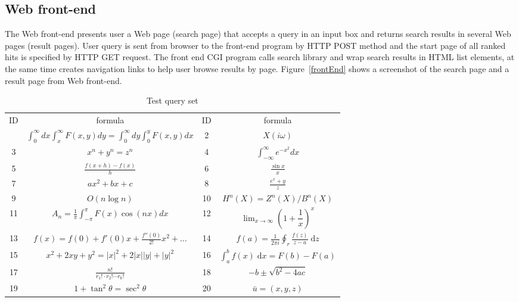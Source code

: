 \subsection{Web front-end}
The Web front-end presents user a Web page (search page) that accepts a query in an input box and returns search results in several Web pages (result pages). 
User query is sent from browser to the front-end program by HTTP POST method and the start page of all ranked hits is specified by HTTP GET request.
The front end CGI program calls search library and wrap search results in HTML list elements, at the same time creates navigation links to help user browse results by page.
Figure~\ref{frontEnd} shows a screenshot of the search page and a result page from Web front-end.

\begin{table*}
\begin{center}
\renewcommand{\arraystretch}{1.5}
\begin{tabular}{|c|c||c|c|}\hline
ID & formula & ID & formula \\ \thickhline
1 & 
$\int_0^\infty dx \int_{x}^\infty F(x,y)dy  =\int_0^\infty dy \int_{0}^y F(x,y)dx$ &
2 & 
$X(i\omega)$ \\\hline

3 & 
$x^n + y^n=z^n$ &
4 & 
$\int^{\infty}_{-\infty} e^{-x^2} dx$ \\\hline

5 & 
$\frac{f(x+h)-f(x)}{h}$ &
6 & 
$\frac {\sin x} x$ \\\hline

7 & 
$ax^2 + bx +c$ &
8 & 
$\frac {e^x + y}{z}$ \\\hline

9 & 
$O(n \log n)$ &
10 & 
$H^n(X) = Z^n (X) / B^n(X)$ \\\hline

11 & 
$A_n = \frac 1 \pi \int_{-\pi}^\pi F(x) \cos(nx) dx$ &
12 & 
$\lim_{x \to \infty} (1 + \dfrac 1x)^x$ \\\hline

13 & 
$f(x) = f(0) + f'(0)x + \frac{f''(0)}{2!} x^2 + \ldots$ &
14 & 
$f(a) = \frac 1 {2 \pi i} \oint_r \frac{f(z)}{z-a} \;\mathrm{d}z$ \\\hline

15 & 
$x^2 + 2xy + y^2 = |x|^2 + 2|x||y| + |y| ^2$ &
16 & 
$\int_a^b f(x) \;\mathrm{d}x = F(b) - F(a)$ \\\hline

17 & 
$\frac {n!}{r_1! \cdot r_2! \cdots r_k!}$ &
18 & 
$-b \pm \sqrt{b^2 - 4ac}$ \\\hline

19 & 
$1+\tan^2 \theta = \sec^2 \theta$ &
20 & 
$\bar{u} = (x,y,z)$ \\\hline

\end{tabular}
\renewcommand{\arraystretch}{1}
\end{center}
\caption{Test query set}\label{TestQ}
\end{table*}

